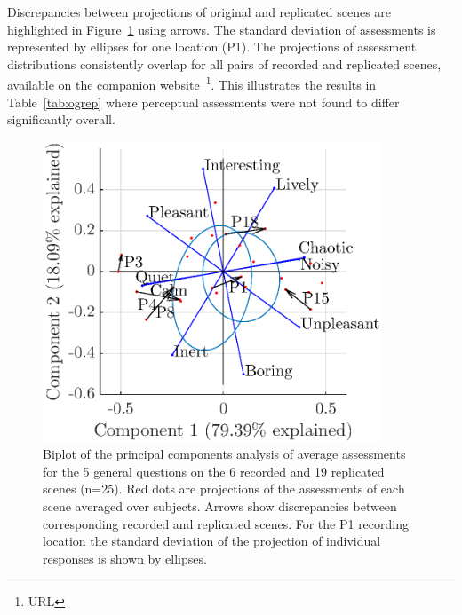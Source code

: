 \documentclass[11pt,a4paper]{article}
\begin{document}
Discrepancies between projections of original and replicated scenes are highlighted in Figure~\ref{fig:pspace_rec} using arrows. The standard deviation of assessments is represented by ellipses for one location (P1). The projections of assessment distributions consistently overlap for all pairs of recorded and replicated scenes, available on the companion website~\footnote{URL}. This illustrates the results in Table~\ref{tab:ogrep} where perceptual assessments were not found to differ significantly overall.

\begin{figure}[h]
    \centering
    \includegraphics[width=0.9\textwidth]{figures/pca_p1.eps}
    \caption{Biplot of the principal components analysis of average assessments for the 5 general questions on the 6 recorded and 19 replicated scenes (n=25). Red dots are projections of the assessments of each scene averaged over subjects. Arrows show discrepancies between corresponding recorded and replicated scenes. For the P1 recording location the standard deviation of the projection of individual responses is shown by ellipses.}\label{fig:pspace_rec}
\end{figure}
\end{document}
